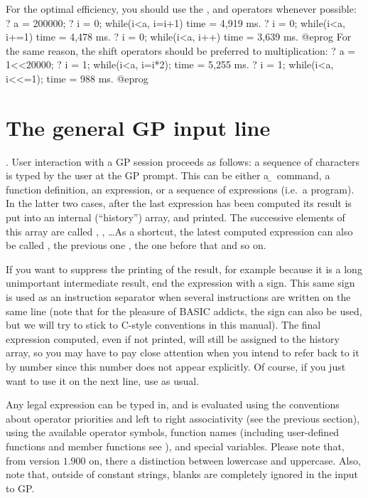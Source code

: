  For the optimal efficiency, you should use the
\kbd{++}, \kbd{--} and \kbd{=} operators whenever possible:
\bprog
? a = 200000;
? i = 0; while(i<a, i=i+1)
time = 4,919 ms.
? i = 0; while(i<a, i+=1)
time = 4,478 ms.
? i = 0; while(i<a, i++)
time = 3,639 ms.
@eprog
\noindent For the same reason, the shift operators should be preferred to
multiplication:
\bprog
? a = 1<<20000;
? i = 1; while(i<a, i=i*2);
time = 5,255 ms.
? i = 1; while(i<a, i<<=1);
time = 988 ms.
@eprog

\section{The general GP input line}
. User interaction with a GP session proceeds as
follows: a sequence of characters is typed by the user at the GP prompt. This
can be either a \b~command, a function definition, an expression, or a
sequence of expressions (i.e.~a program). In the latter two cases, after the
last expression has been computed its result is put into an internal
(``history'') array, and printed. The successive elements of this array are
called , , \dots As a shortcut, the latest computed
expression can also be called \kbd{\%}, the previous one , the one
before that  and so on.

If you want to suppress the printing of the result, for example because it
is a long unimportant intermediate result, end the expression with a
\kbd{;} sign. This same sign is used as an instruction separator when several
instructions are written on the same line (note that for the pleasure of BASIC
addicts, the \kbd{:} sign can also be used, but we will try to stick to
C-style conventions in this manual). The final expression computed, even
if not printed, will still be assigned to the history array, so you may have
to pay close attention when you intend to refer back to it by number since
this number does not appear explicitly. Of course, if you just want to use
it on the next line, use \kbd{\%} as usual.

Any legal expression can be typed in, and is evaluated using the
conventions about operator priorities and left to right associativity (see
the previous section), using the available operator symbols, function names
(including user-defined functions and member functions see
), and special variables. Please note that, from
version $1.900$ on, there  a distinction
between lowercase and uppercase. Also, note that, outside of constant
strings, blanks are completely ignored in the input to GP.

